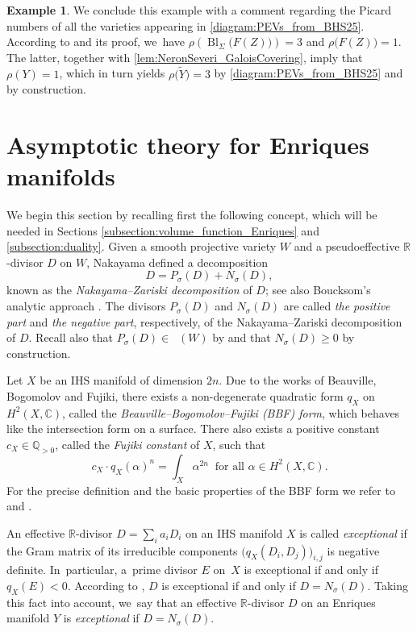 \documentclass[10pt]{amsart}
\theoremstyle{plain}
\theoremstyle{definition}
\newtheorem{exa}[thm]{Example}
\newcommand{\Q}{\mathbb{Q}}
\newcommand{\R}{\mathbb{R}}
\newcommand{\C}{\mathbb{C}}
\DeclareMathOperator{\Bl}{Bl}
\DeclareMathOperator{\Movb}{\overline{\mathrm{Mov}}}
\begin{document}
\begin{exa}
We conclude this example with a comment regarding the Picard numbers of all the varieties appearing in \eqref{diagram:PEVs_from_BHS25}. According to \cite[Cor.\,4.2]{BHS25} and its proof, we~have
$\rho \left(\Bl_\Sigma \bigl(F(Z)\bigr) \right) = 3$
and $\rho \bigl(F(Z) \bigr) = 1$. The latter, together with \autoref{lem:NeronSeveri_GaloisCovering}, imply that $\rho (Y) = 1$, which in turn yields $\rho \bigl(\widetilde{Y} \bigr) = 3$ by \eqref{diagram:PEVs_from_BHS25} and by construction.
\end{exa}

\section{Asymptotic theory for Enriques manifolds}
\label{section:asymptotic_theory_EM}

We begin this section by recalling first the following concept, which will be needed in Sections \ref{subsection:volume_function_Enriques} and \ref{subsection:duality}. Given a smooth projective variety $W$ and a pseudoeffective $\R$\nobreakdash-divisor $D$ on $W$, Naka\-yama \cite{Nak04book} defined a decomposition
\[
D = P_\sigma (D) + N_\sigma (D),
\]
known as the \emph{Nakayama--Zariski decomposition} of $D$; see also Boucksom's analytic approach \cite{Boucksom04}. The divisors $P_\sigma(D)$ and $N_\sigma(D)$ are called \emph{the positive part} and \emph{the negative part}, respectively, of the Nakayama--Zariski decomposition of $ D $. Recall also that $ P_\sigma(D) \in \Movb(W) $ by \cite[Lem.\,III.1.8 \& Prop.\,III.1.14(1)]{Nak04book} and that $ N_\sigma(D) \geq 0 $ by construction.

Let $X$ be an IHS manifold of dimension $2n$.
Due to the works of Beauville, Bogomolov and Fujiki, there exists a non-degenerate quadratic form $q_X$ on $H^2(X,\C)$, called the \emph{Beauville--Bogomolov--Fujiki (BBF) form}, which behaves like the intersection form on a surface. There also exists a positive constant $c_X \in \Q_{>0}$, called the \emph{Fujiki constant} of $X$, such that
\[
c_X \cdot q_X(\alpha)^n= \int_X \alpha^{2n} \ \text{ for all } \alpha \in H^2(X,\C).
\]
For the precise definition and the basic properties of the BBF form we refer to \cite[\S\S 8 \& 9]{Beauville83a} and \cite[\S 23]{GHJ03book}.

An effective $\R$\nobreakdash-divisor $D = \sum_i a_i D_i$ on an IHS manifold $X$ is called \emph{exceptional} if the Gram matrix of its irreducible components $\bigl(q_X (D_i, D_j) \bigr)_{i,j}$ is negative definite. In~particular, a~prime divisor $E$ on~$X$ is exceptional if and only if $q_X(E) < 0$. According to \cite[Th.\,4.5]{Boucksom04}, $D$ is exceptional if and only if $D = N_{\sigma} (D)$. Taking this fact into account, we~say that an effective $\R$\nobreakdash-divisor $D$ on an Enriques manifold $Y$ is \emph{exceptional} if $D = N_\sigma(D)$.
\end{document}
